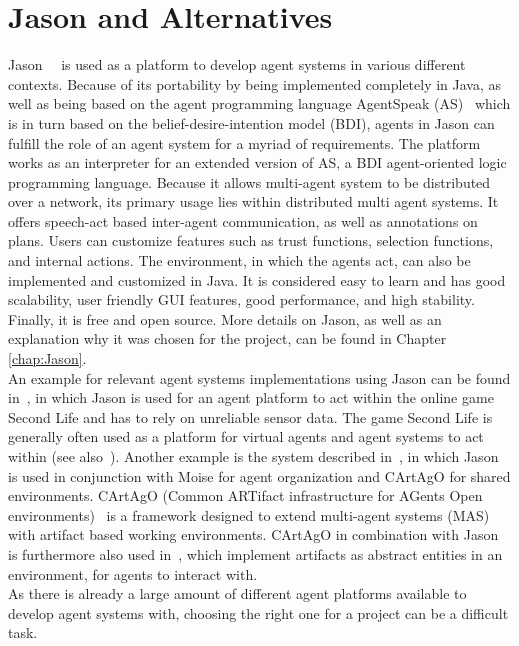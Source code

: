 \documentclass[draft,final]{vutinfth} %
\begin{document}
\section{Jason and Alternatives}
\label{chap:jasonandalternatives}

Jason~\cite{bordini2004jason}~\cite{Bordini:2007:PMS:1197104} is used as a platform to develop agent systems in various different contexts. 
Because of its portability by being implemented completely in Java, as well as being based on the agent programming language AgentSpeak (AS)~\cite{rao1996agentspeak} which is in turn based on the belief-desire-intention model (BDI), agents in Jason can fulfill the role of an agent system for a myriad of requirements. 
The platform works as an interpreter for an extended version of AS, a BDI agent-oriented logic programming language. 
Because it allows multi-agent system to be distributed over a network, its primary usage lies within distributed multi agent systems.
It offers speech-act based inter-agent communication, as well as annotations on plans. 
Users can customize features such as trust functions, selection functions, and internal actions. 
The environment, in which the agents act, can also be implemented and customized in Java. 
It is considered easy to learn and has good scalability, user friendly GUI features, good performance, and high stability. 
Finally, it is free and open source. More details on Jason, as well as an explanation why it was chosen for the project, can be found in Chapter \autoref{chap:Jason}. \\
An example for relevant agent systems implementations using Jason can be found in~\cite{ranathunga2011interfacing}, in which Jason is used for an agent platform to act within the online game Second Life and has to rely on unreliable sensor data. 
The game Second Life is generally often used as a platform for virtual agents and agent systems to act within (see also~\cite{bogdanovych2010authentic}). 
Another example is the system described in~\cite{boissier2013multi}, in which Jason is used in conjunction with Moise for agent organization and CArtAgO for shared environments. 
CArtAgO (Common ARTifact infrastructure for AGents Open environments)~\cite{ricci2006cartago} is a framework designed to extend multi-agent systems (MAS) with artifact based working environments. 
CArtAgO in combination with Jason is furthermore also used in~\cite{ricci2011environment}, which implement artifacts as abstract entities in an environment, for agents to interact with. \\
As there is already a large amount of different agent platforms available to develop agent systems with, choosing the right one for a project can be a difficult task. 
\end{document}

